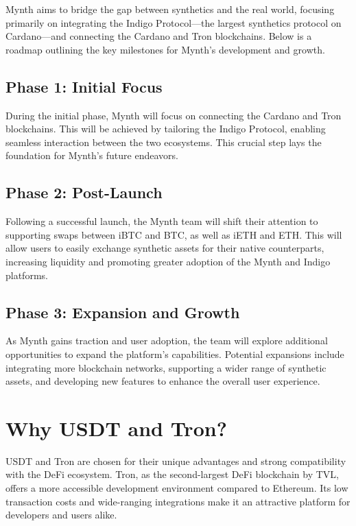 Mynth aims to bridge the gap between synthetics and the real world,
focusing primarily on integrating the Indigo Protocol---the largest
synthetics protocol on Cardano---and connecting the Cardano and Tron
blockchains. Below is a roadmap outlining the key milestones for Mynth's
development and growth.

\hypertarget{phase-1-initial-focus}{%
\subsection{Phase 1: Initial Focus}\label{phase-1-initial-focus}}

During the initial phase, Mynth will focus on connecting the Cardano and
Tron blockchains. This will be achieved by tailoring the Indigo
Protocol, enabling seamless interaction between the two ecosystems. This
crucial step lays the foundation for Mynth's future endeavors.

\hypertarget{phase-2-post-launch}{%
\subsection{Phase 2: Post-Launch}\label{phase-2-post-launch}}

Following a successful launch, the Mynth team will shift their attention
to supporting swaps between iBTC and BTC, as well as iETH and ETH. This
will allow users to easily exchange synthetic assets for their native
counterparts, increasing liquidity and promoting greater adoption of the
Mynth and Indigo platforms.

\hypertarget{phase-3-expansion-and-growth}{%
\subsection{Phase 3: Expansion and
Growth}\label{phase-3-expansion-and-growth}}

As Mynth gains traction and user adoption, the team will explore
additional opportunities to expand the platform's capabilities.
Potential expansions include integrating more blockchain networks,
supporting a wider range of synthetic assets, and developing new
features to enhance the overall user experience.

\hypertarget{why-usdt-and-tron}{%
\section{Why USDT and Tron?}\label{why-usdt-and-tron}}

USDT and Tron are chosen for their unique advantages and strong
compatibility with the DeFi ecosystem. Tron, as the second-largest DeFi
blockchain by TVL, offers a more accessible development environment
compared to Ethereum. Its low transaction costs and wide-ranging
integrations make it an attractive platform for developers and users
alike.

